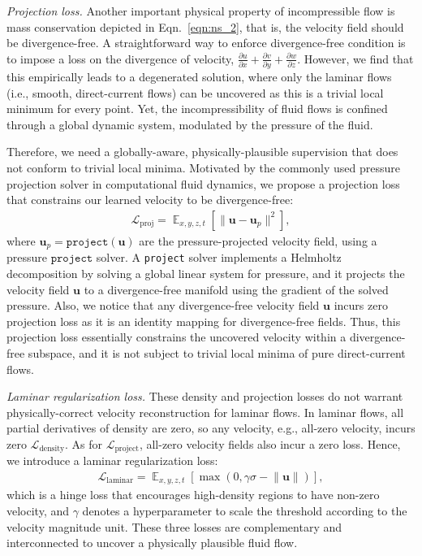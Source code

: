\documentclass{article}
\newcommand{\eqn}[1]{Eqn.~\ref{#1}}
\begin{document}
\emph{Projection loss.} Another important physical property of incompressible flow is mass conservation depicted in \eqn{eqn:ns_2}, that is, the velocity field should be divergence-free. A straightforward way to enforce divergence-free condition is to impose a loss on the divergence of velocity, $\frac{\partial u}{\partial x}+\frac{\partial v}{\partial y}+\frac{\partial w}{\partial z}$. However, we find that this empirically leads to a degenerated solution, where only the laminar flows (i.e., smooth, direct-current flows) can be uncovered as this is a trivial local minimum for every point. Yet, the incompressibility of fluid flows is confined through a global dynamic system, modulated by the pressure of the fluid.

Therefore, we need a globally-aware, physically-plausible supervision that does not conform to trivial local minima. Motivated by the commonly used pressure projection solver in computational fluid dynamics, we propose a projection loss that constrains our learned velocity to be divergence-free:
\begin{align}\label{eqn:projection}
    \mathcal{L}_\text{proj} = \mathop{\mathbb{E}}_{x, y, z, t}\left[\lVert \mathbf{u}-\mathbf{u}_p \rVert^2\right],
\end{align}
where $\mathbf{u}_p = \texttt{project}(\mathbf{u})$ are the pressure-projected velocity field, using a pressure $\texttt{project}$ solver. A \texttt{project} solver implements a Helmholtz decomposition by solving a global linear system for pressure, and it projects the velocity field $\mathbf{u}$ to a divergence-free manifold using the gradient of the solved pressure. Also, we notice that any divergence-free velocity field $\mathbf{u}$ incurs zero projection loss as it is an identity mapping for divergence-free fields. Thus, this projection loss essentially constrains the uncovered velocity within a divergence-free subspace, and it is not subject to trivial local minima of pure direct-current flows. 

\emph{Laminar regularization loss.} These density and projection losses do not warrant physically-correct velocity reconstruction for laminar flows. In laminar flows, all partial derivatives of density are zero, so any velocity, e.g., all-zero velocity, incurs zero $\mathcal{L}_\text{density}$. As for $\mathcal{L}_\text{project}$, all-zero velocity fields also incur a zero loss. Hence, we introduce a laminar regularization loss:
\begin{align}\label{eqn:laminar}
    \mathcal{L}_\text{laminar} = \mathop{\mathbb{E}}_{x, y, z, t}\left[ \max(0, \gamma\sigma-\lVert \mathbf{u} \rVert) \right],
\end{align}
which is a hinge loss that encourages high-density regions to have non-zero velocity, and $\gamma$ denotes a hyperparameter to scale the threshold according to the velocity magnitude unit. These three losses are complementary and interconnected to uncover a physically plausible fluid flow.
\end{document}
